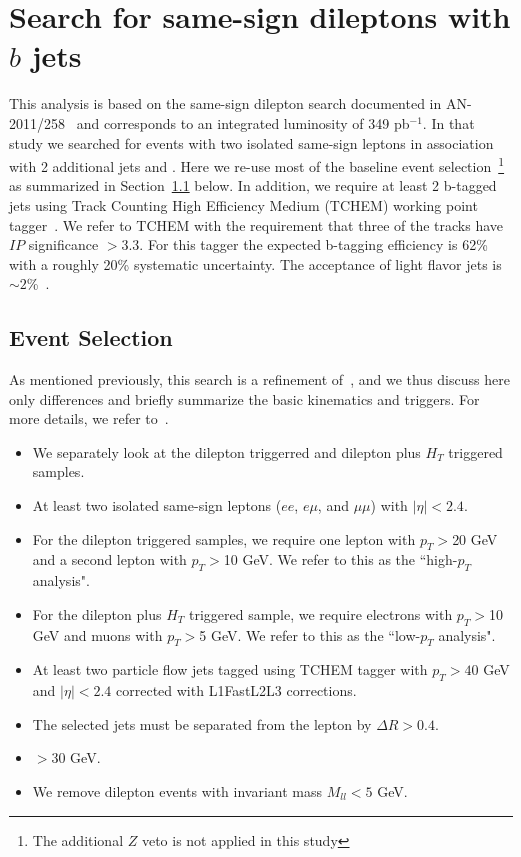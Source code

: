 \section{Search for same-sign dileptons with $b$ jets}
\label{sec:searchbtag}

This analysis is based on the same-sign dilepton search documented in AN-2011/258~\cite{ssnote2011} and corresponds to an
integrated luminosity of 349 pb$^{-1}$. In that study we searched for events with two isolated same-sign leptons
in association with 2 additional jets and \met. Here we re-use most of the baseline event selection~\footnote{The additional 
$Z$ veto is not applied in this study} as summarized in Section~\ref{sec:eventsel} below. 
In addition, we require at least 2 b-tagged jets using Track Counting High Efficiency 
Medium (TCHEM) working point tagger~\cite{BTVPAS2011}. We refer to TCHEM with the requirement that three of the tracks have $IP$ 
significance $ > 3.3$. For this tagger the expected b-tagging efficiency is 62\% with a roughly 20\% systematic uncertainty.
The acceptance of light flavor jets is $\sim 2$\%~\cite{BTVPAS2011}.

\subsection{Event Selection}
\label{sec:eventsel}

As mentioned previously, this search is a refinement of~\cite{ssnote2011}, and we thus discuss here only differences and briefly summarize the basic kinematics and triggers.
For more details, we refer to~\cite{ssnote2011}.

\begin{itemize}
\item We separately look at the dilepton triggerred and dilepton plus $H_T$ triggered samples.
\item At least two isolated same-sign leptons ($ee$, $e\mu$, and $\mu\mu$) with $|\eta| < 2.4$.
\item For the dilepton triggered samples, we require one lepton with $p_T>$20 GeV and a second lepton with $p_T >$10 GeV. We refer to this as the ``high-$p_T$ analysis".
\item For the dilepton plus $H_T$ triggered sample, we require electrons with $p_T>$10 GeV and muons with $p_T >$5 GeV. We refer to this as the ``low-$p_T$ analysis".
\item At least two particle flow jets tagged using TCHEM tagger with $p_T > 40$ GeV and $|\eta| < 2.4$
corrected with L1FastL2L3 corrections.
\item The selected jets must be separated from the lepton by $\Delta R > 0.4$.
\item \met $> 30$ GeV.
\item We remove dilepton events with invariant mass $M_{ll} < 5$ GeV.
\end{itemize}

